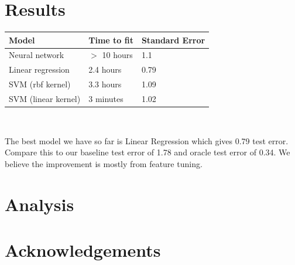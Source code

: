 \documentclass[journal]{IEEEtran}
\begin{document}
\section{Results}
\smallskip
\begin{tabular}{|l |l l|} %
\hline
Model               & Time to fit & Standard Error  \\ [0.5ex] %
\hline
Neural network      & $>$ 10 hours  & 1.1 \\
Linear regression   & 2.4 hours   & 0.79 \\
SVM (rbf kernel)    & 3.3 hours   & 1.09 \\
SVM (linear kernel) & 3 minutes   & 1.02 \\ [1ex]
\hline %
\end{tabular}
\smallskip
\\
\par The best model we have so far is Linear Regression which gives 0.79 test error.
Compare this to our baseline test error of 1.78 and oracle test error of 0.34.
We believe the improvement is mostly from feature tuning.

\section{Analysis}

\section{Acknowledgements}

\end{document}
